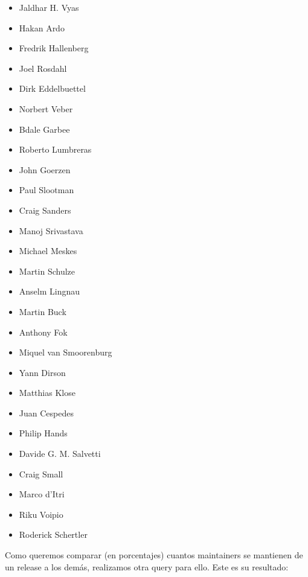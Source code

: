 \documentclass[a4paper, 12pt]{book}
\begin{document}
	\begin{multicols}{3}
		\begin{itemize}
			\item Jaldhar H. Vyas
			\item Hakan Ardo
			\item Fredrik Hallenberg
			\item Joel Rosdahl
			\item Dirk Eddelbuettel
			\item Norbert Veber
			\item Bdale Garbee
			\item Roberto Lumbreras
			\item John Goerzen
			\item Paul Slootman
			\item Craig Sanders
			\item Manoj Srivastava
			\item Michael Meskes
			\item Martin Schulze
			\item Anselm Lingnau
			\item Martin Buck
			\item Anthony Fok
			\item Miquel van Smoorenburg
			\item Yann Dirson
			\item Matthias Klose
			\item Juan Cespedes
			\item Philip Hands
			\item Davide G. M. Salvetti
			\item Craig Small
			\item Marco d'Itri
			\item Riku Voipio
			\item Roderick Schertler
		\end{itemize}
	\end{multicols}
		

	
	
	Como queremos comparar (en porcentajes) cuantos maintainers se mantienen de un release a los demás, realizamos otra query para ello.
	Este es su resultado:
	
\end{document}
